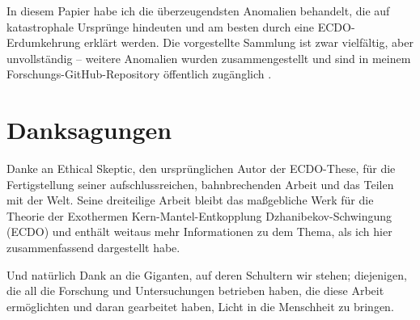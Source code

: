 \documentclass[10pt,twocolumn,letterpaper]{article}
\begin{document}
In diesem Papier habe ich die überzeugendsten Anomalien behandelt, die auf katastrophale Ursprünge hindeuten und am besten durch eine ECDO-Erdumkehrung erklärt werden. Die vorgestellte Sammlung ist zwar vielfältig, aber unvollständig – weitere Anomalien wurden zusammengestellt und sind in meinem Forschungs-GitHub-Repository öffentlich zugänglich \cite{2}.

\section{Danksagungen}

Danke an Ethical Skeptic, den ursprünglichen Autor der ECDO-These, für die Fertigstellung seiner aufschlussreichen, bahnbrechenden Arbeit und das Teilen mit der Welt. Seine dreiteilige Arbeit \cite{1} bleibt das maßgebliche Werk für die Theorie der Exothermen Kern-Mantel-Entkopplung Dzhanibekov-Schwingung (ECDO) und enthält weitaus mehr Informationen zu dem Thema, als ich hier zusammenfassend dargestellt habe.

Und natürlich Dank an die Giganten, auf deren Schultern wir stehen; diejenigen, die all die Forschung und Untersuchungen betrieben haben, die diese Arbeit ermöglichten und daran gearbeitet haben, Licht in die Menschheit zu bringen.

{\small


}
\end{document}
